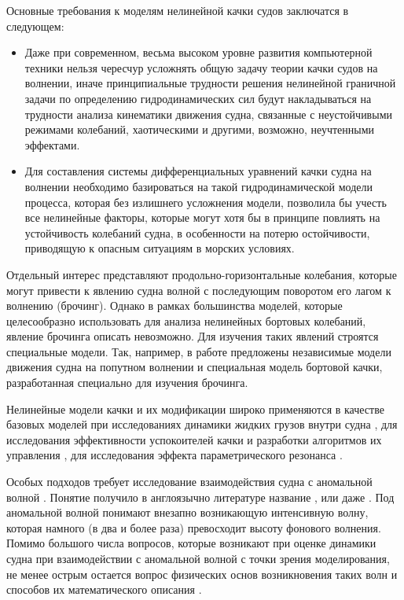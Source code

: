 Основные требования к моделям нелинейной качки судов заключатся в следующем: 
\begin{itemize}
	\item Даже при современном, весьма высоком уровне развития компьютерной техники нельзя чересчур усложнять общую задачу теории качки судов на волнении, иначе принципиальные трудности решения нелинейной граничной задачи по определению гидродинамических сил будут накладываться на трудности анализа кинематики движения судна, связанные с неустойчивыми режимами колебаний, хаотическими и другими, возможно, неучтенными эффектами.
	\item Для составления системы дифференциальных уравнений качки судна на волнении необходимо базироваться на такой гидродинамической модели процесса, которая без излишнего усложнения модели, позволила бы учесть все нелинейные факторы, которые могут хотя бы в принципе повлиять на устойчивость колебаний судна, в особенности на потерю остойчивости, приводящую к опасным ситуациям в морских условиях.
\end{itemize}

Отдельный интерес представляют продольно-горизонтальные колебания, которые могут привести к явлению  судна волной с последующим поворотом его лагом к волнению (брочинг). Однако в рамках большинства моделей, которые целесообразно использовать для анализа нелинейных бортовых колебаний, явление брочинга описать невозможно. Для изучения таких явлений строятся специальные модели. Так, например, в работе \citep{dk23}\citep{dk24} предложены независимые модели движения судна на попутном волнении и специальная модель бортовой качки, разработанная специально для изучения брочинга. 

Нелинейные модели качки и их модификации широко применяются в качестве базовых моделей при исследованиях динамики жидких грузов внутри судна \citep{dk25}\citep{dk26}, для исследования эффективности успокоителей качки и разработки алгоритмов их управления \citep{dk27}\citep{dk28}\citep{dk29}, для исследования эффекта параметрического резонанса \citep{dk30}.

Особых подходов требует исследование взаимодействия судна с аномальной волной \citep{dk31}. Понятие  получило в англоязычно литературе название , или даже . Под аномальной волной понимают внезапно возникающую интенсивную волну, которая намного (в два и более раза) превосходит высоту фонового волнения. Помимо большого числа вопросов, которые возникают при оценке динамики судна при взаимодействии с аномальной волной с точки зрения моделирования, не менее острым остается вопрос физических основ возникновения таких волн и способов их математического описания \citep{dk32}.

